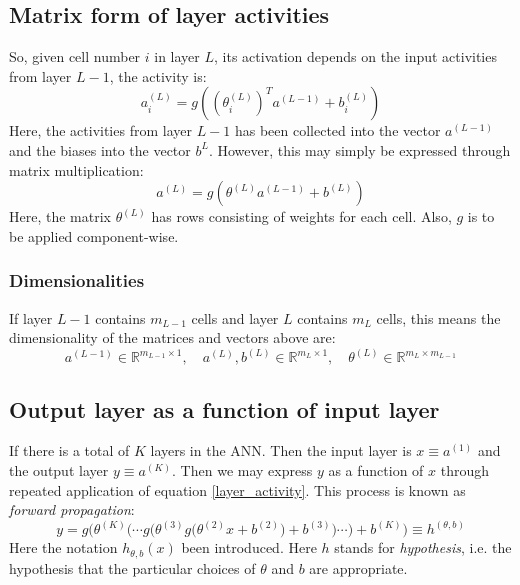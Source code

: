 \documentclass[12pt, a4paper]{article}
\numberwithin{equation}{section}
\begin{document}
\subsection{Matrix form of layer activities}
So, given cell number $i$ in layer $L$, its activation depends on the input activities from layer $L-1$, the activity is:
\begin{equation}
\label{layer_activity}
a^{(L)}_i=g\left(\left(\theta^{(L)}_i\right)^T a^{(L-1)} + b_i^{(L)}\right)
\end{equation}
Here, the activities from layer $L-1$ has been collected into the vector $a^{(L-1)}$ and the biases into the vector $b^{L}$. However, this may simply be expressed through matrix multiplication:
\begin{equation}
a^{(L)}=g\left(\theta^{(L)}a^{(L-1)}+b^{(L)}\right)
\end{equation}
Here, the matrix $\theta^{(L)}$ has rows consisting of weights for each cell. Also, $g$ is to be applied component-wise.

\subsubsection{Dimensionalities}
If layer $L-1$ contains $m_{L-1}$ cells and layer $L$ contains $m_L$ cells, this means the dimensionality of the matrices and vectors above are:
\begin{equation}
a^{(L-1)}\in\mathbb{R}^{m_{L-1}\times 1},\quad a^{(L)}, b^{(L)}\in\mathbb{R}^{m_L\times 1},\quad\theta^{(L)}\in\mathbb{R}^{m_L\times m_{L-1}} 
\end{equation}

\subsection{Output layer as a function of input layer}
If there is a total of $K$ layers in the ANN. Then the input layer is $x\equiv a^{(1)}$ and the output layer $y\equiv a^{(K)}$. Then we may express $y$ as a function of $x$ through repeated application of equation \ref{layer_activity}. This process is known as \textit{forward propagation}:
\begin{equation}
\label{hypothesis}
y=g\Bigg(\theta^{(K)}\bigg(\cdots g\Big(\theta^{(3)} g\big(\theta^{(2)}x+b^{(2)}\big)+b^{(3)}\Big)\cdots\bigg)+b^{(K)}\Bigg)\equiv h^{(\theta,b)}
\end{equation}
Here the notation $h_{\theta,b}(x)$ been introduced. Here $h$ stands for \textit{hypothesis}, i.e. the hypothesis that the particular choices of $\theta$ and $b$ are appropriate.
\end{document}
